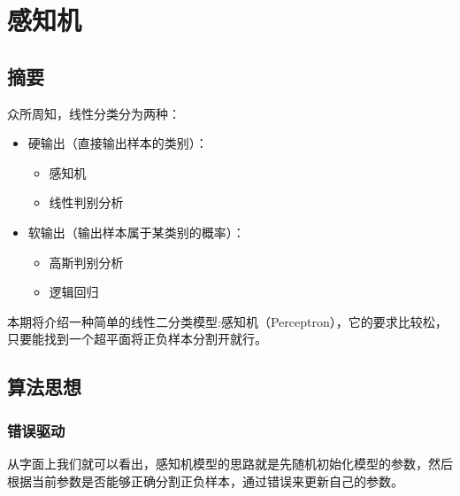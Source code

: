 \documentclass{report}
\begin{document}
\section{感知机}
\subsection{摘要}
众所周知，线性分类分为两种：
\begin{itemize}
	\item 硬输出（直接输出样本的类别）：
	\begin{itemize}
	\item 感知机
	\item 线性判别分析
	\end{itemize}
	\item 软输出（输出样本属于某类别的概率）：
	\begin{itemize}
	\item 高斯判别分析
	\item 逻辑回归
	\end{itemize}
\end{itemize}
本期将介绍一种简单的线性二分类模型:感知机（Perceptron），它的要求比较松，只要能找到一个超平面将正负样本分割开就行。
\subsection{算法思想}
\subsubsection{错误驱动}
从字面上我们就可以看出，感知机模型的思路就是先随机初始化模型的参数，然后根据当前参数是否能够正确分割正负样本，通过错误来更新自己的参数。
\end{document}
